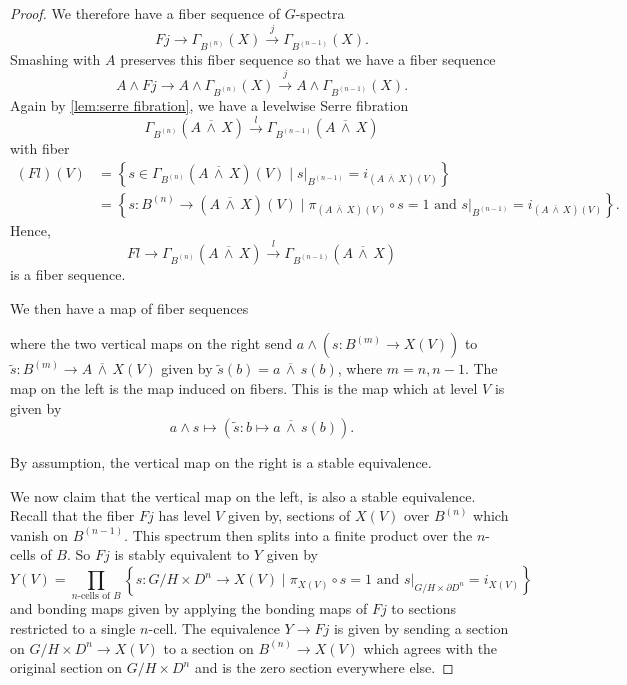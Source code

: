 \documentclass[11pt]{amsart}
\newcommand{\barsmash}{\,\overline\wedge\,}
\theoremstyle{plain}   %
\theoremstyle{definition}
\theoremstyle{remark}
\numberwithin{equation}{section}
\begin{document}
\begin{proof}
We therefore have a fiber sequence of $G$-spectra
\[
Fj \rightarrow\Gamma_{B^{(n)}}(X) \xrightarrow{j} \Gamma_{B^{(n-1)}}(X).
\]
Smashing with $A$ preserves this fiber sequence so that we have a fiber sequence
\[
A\wedge Fj \rightarrow A \wedge\Gamma_{B^{(n)}}(X) \xrightarrow{j} A\wedge\Gamma_{B^{(n-1)}}(X).
\]
Again by \cref{lem:serre fibration}, we have a levelwise Serre fibration
\[
\Gamma_{B^{(n)}}(A\barsmash X)\xrightarrow{l} \Gamma_{B^{(n-1)}}(A\barsmash X)
\]
with fiber 
\begin{align*}
(Fl)(V) 
&=\left\{ s\in \Gamma_{B^{(n)}}(A\barsmash X)(V)\mid s|_{B^{(n-1)}} = i_{(A\barsmash X)(V)} \right\}\\
& = \left\{s:B^{(n)}\to (A\barsmash X)(V)\mid \pi_{(A\barsmash X)(V)}\circ s = 1 \text{ and } s|_{B^{(n-1)}} = i_{(A\barsmash X)(V)}\right\}.
\end{align*}
Hence, 
\[
Fl\rightarrow \Gamma_{B^{(n)}}(A\barsmash X)\xrightarrow{l} \Gamma_{B^{(n-1)}}(A\barsmash X)
\]
is a fiber sequence.

We then have a map of fiber sequences
\begin{figure}[H]
\center
{}
\end{figure}
where the two vertical maps on the right send $a\wedge (s:B^{(m)}\to X(V))$ to $\tilde{s}:B^{(m)}\to A\barsmash X(V)$ given by $\tilde{s}(b)=a\barsmash s(b)$, where $m=n,n-1$. The map on the left is the map induced on fibers. This is the map which at level $V$ is given by
\[
a\wedge s\mapsto (\tilde{s}:b\mapsto a\barsmash s(b)).
\]

By assumption, the vertical map on the right is a stable equivalence. 

We now claim that the vertical map on the left, is also a stable equivalence. Recall that the fiber $Fj$ has level $V$ given by, sections of $X(V)$ over $B^{(n)}$ which vanish on $B^{(n-1)}$. This spectrum then splits into a finite product over the $n$-cells of $B$. So $Fj$ is stably equivalent to $Y$ given by 
\[
Y(V) = \prod_{\text{$n$-cells of $B$}}\left\{ s:G/H\times D^n \to X(V)\mid \pi_{X(V)}\circ s = 1 \text{ and } s|_{G/H\times \partial D^n} = i_{X(V)} \right\}
\]
and bonding maps given by applying the bonding maps of $Fj$ to sections restricted to a single $n$-cell. The equivalence $Y\to Fj$ is given by sending a section on $G/H\times D^n\to X(V)$ to a section on $B^{(n)}\to X(V)$ which agrees with the original section on $G/H\times D^n$ and is the zero section everywhere else.


\end{proof}
\end{document}
